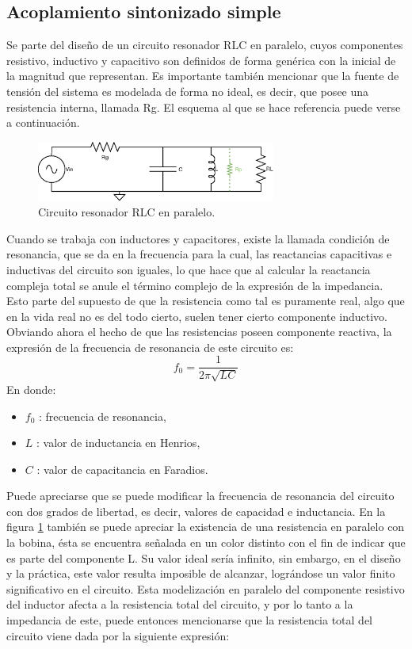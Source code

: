 \documentclass{article}
\begin{document}
\subsection{Acoplamiento sintonizado simple}
Se parte del diseño de un circuito resonador RLC en paralelo, cuyos componentes resistivo, inductivo y capacitivo son definidos de forma genérica con la inicial de la magnitud que representan. Es importante también mencionar que la fuente de tensión del sistema es modelada de forma no ideal, es decir, que posee una resistencia interna, llamada Rg. El esquema al que se hace referencia puede verse a continuación.
\begin{figure}[H]
\centering
\includegraphics[width=0.7\textwidth]{./img/figura1.eps}
\caption{Circuito resonador RLC en paralelo.}
\label{fig:circuito}
\end{figure}
\noindent Cuando se trabaja con inductores y capacitores, existe la llamada condición de resonancia, que se da en la frecuencia para la cual, las reactancias capacitivas e inductivas del circuito son iguales, lo que hace que al calcular la reactancia compleja total se anule el término complejo de la expresión de la impedancia. Esto parte del supuesto de que la resistencia como tal es puramente real, algo que en la vida real no es del todo cierto, suelen tener cierto componente inductivo.
Obviando ahora el hecho de que las resistencias poseen componente reactiva, la expresión de la frecuencia de resonancia de este circuito es:
\begin{equation*}
    f_0 = \frac{1}{2\pi \sqrt{LC}}
\end{equation*}
\noindent En donde:
\begin{itemize}
    \item $f_0$ : frecuencia de resonancia,
    \item $L$ : valor de inductancia en Henrios,
    \item $C$ : valor de capacitancia en Faradios.
\end{itemize}
\noindent Puede apreciarse que se puede modificar la frecuencia de resonancia del circuito con dos grados de libertad, es decir, valores de capacidad e inductancia.
En la figura \ref{fig:circuito} también se puede apreciar la existencia de una resistencia en paralelo con la bobina, ésta se encuentra señalada en un color distinto con el fin de indicar que es parte del componente L. Su valor ideal sería infinito, sin embargo, en el diseño y la práctica, este valor resulta imposible de alcanzar, lográndose un valor finito significativo en el circuito. Esta modelización en paralelo del componente resistivo del inductor afecta a la resistencia total del circuito, y por lo tanto a la impedancia de este, puede entonces mencionarse que la resistencia total del circuito viene dada por la siguiente expresión:
\end{document}
